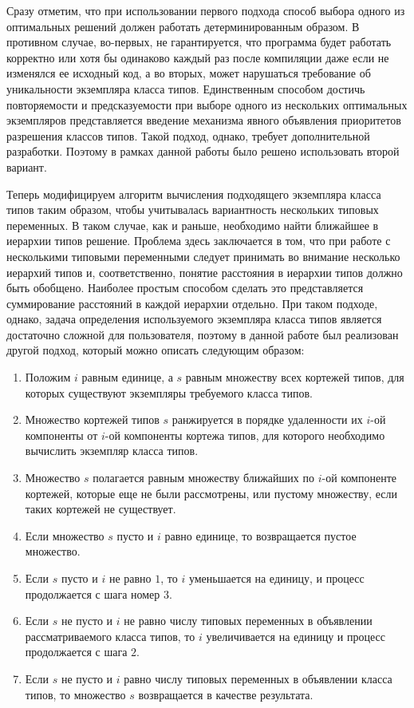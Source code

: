 Сразу отметим, что при использовании первого подхода способ выбора одного из оптимальных решений должен работать детерминированным образом. В противном случае, во-первых, не гарантируется, что программа будет работать корректно или хотя бы одинаково каждый раз после компиляции даже если не изменялся ее исходный код, а во вторых, может нарушаться требование об уникальности экземпляра класса типов. Единственным способом достичь повторяемости и предсказуемости при выборе одного из нескольких оптимальных экземпляров представляется введение механизма явного объявления приоритетов разрешения классов типов. Такой подход, однако, требует дополнительной разработки. Поэтому в рамках данной работы было решено использовать второй вариант. 

Теперь модифицируем алгоритм вычисления подходящего экземпляра класса типов таким образом, чтобы учитывалась вариантность нескольких типовых переменных. В таком случае, как и раньше, необходимо найти ближайшее в иерархии типов решение. Проблема здесь заключается в том, что при работе с несколькими типовыми переменными следует принимать во внимание несколько иерархий типов и, соответственно, понятие расстояния в иерархии типов должно быть обобщено. Наиболее простым способом сделать это представляется суммирование расстояний в каждой иерархии отдельно. При таком подходе, однако, задача определения используемого экземпляра класса типов является достаточно сложной для пользователя, поэтому в данной работе был реализован другой подход, который можно описать следующим образом:
\begin{enumerate}
    \item Положим $i$ равным единице, а $s$ равным множеству всех кортежей типов, для которых существуют экземпляры требуемого класса типов.
    \item Множество кортежей типов $s$ ранжируется в порядке удаленности их $i$-ой компоненты от $i$-ой компоненты кортежа типов, для которого необходимо вычислить экземпляр класса типов.
    \item Множество $s$ полагается равным множеству ближайших по $i$-ой компоненте кортежей, которые еще не были рассмотрены, или пустому множеству, если таких кортежей не существует.
    \item Если множество $s$ пусто и $i$ равно единице, то возвращается пустое множество. 
    \item Если $s$ пусто и $i$ не равно $1$, то $i$ уменьшается на единицу, и процесс продолжается с шага номер $3$. 
    \item Если $s$ не пусто и $i$ не равно числу типовых переменных в объявлении рассматриваемого класса типов, то $i$ увеличивается на единицу и процесс продолжается с шага $2$.
    \item Если $s$ не пусто и $i$ равно числу типовых переменных в объявлении класса типов, то множество $s$ возвращается в качестве результата. 
\end{enumerate}
